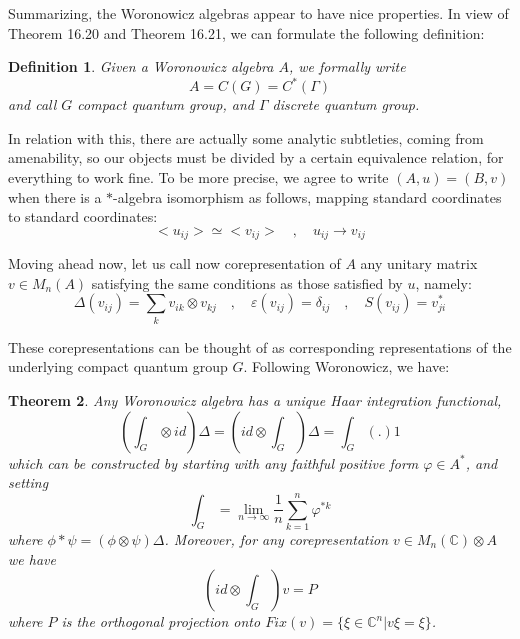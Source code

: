 \documentclass[12pt]{amsbook}
\newtheorem{theorem}{Theorem}[chapter]
\newtheorem{definition}[theorem]{Definition}
\begin{document}
Summarizing, the Woronowicz algebras appear to have nice properties. In view of Theorem 16.20 and Theorem 16.21, we can formulate the following definition:

\begin{definition}
Given a Woronowicz algebra $A$, we formally write
$$A=C(G)=C^*(\Gamma)$$
and call $G$ compact quantum group, and $\Gamma$ discrete quantum group.
\end{definition}

In relation with this, there are actually some analytic subtleties, coming from amenability, so our objects must be divided by a certain equivalence relation, for everything to work fine. To be more precise, we agree to write $(A,u)=(B,v)$ when there is a $*$-algebra isomorphism as follows, mapping standard coordinates to standard coordinates:
$$<u_{ij}>\simeq<v_{ij}>\quad,\quad u_{ij}\to v_{ij}$$

Moving ahead now, let us call now corepresentation of $A$ any unitary matrix $v\in M_n(A)$ satisfying the same conditions as those satisfied by $u$, namely:
$$\Delta(v_{ij})=\sum_kv_{ik}\otimes v_{kj}\quad,\quad
\varepsilon(v_{ij})=\delta_{ij}\quad,\quad
S(v_{ij})=v_{ji}^*$$

These corepresentations can be thought of as corresponding representations of the underlying compact quantum group $G$. Following Woronowicz, we have:

\begin{theorem}
Any Woronowicz algebra has a unique Haar integration functional, 
$$\left(\int_G\otimes id\right)\Delta=\left(id\otimes\int_G\right)\Delta=\int_G(.)1$$
which can be constructed by starting with any faithful positive form $\varphi\in A^*$, and setting
$$\int_G=\lim_{n\to\infty}\frac{1}{n}\sum_{k=1}^n\varphi^{*k}$$
where $\phi*\psi=(\phi\otimes\psi)\Delta$. Moreover, for any corepresentation $v\in M_n(\mathbb C)\otimes A$ we have
$$\left(id\otimes\int_G\right)v=P$$
where $P$ is the orthogonal projection onto $Fix(v)=\{\xi\in\mathbb C^n|v\xi=\xi\}$.
\end{theorem}
\end{document}
